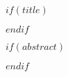 

$if(title)$
\maketitle
$endif$


$if(abstract)$
\begin{abstract}
$abstract$
\end{abstract}
$endif$